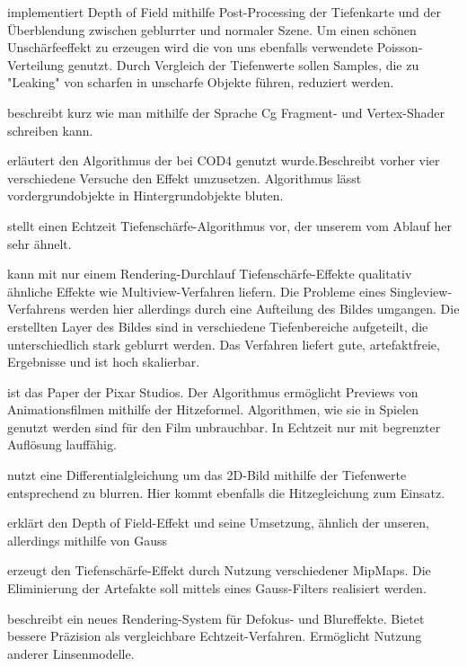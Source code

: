 \cite{Scheuermann:2004qf} implementiert Depth of Field mithilfe Post-Processing der Tiefenkarte und der Überblendung zwischen geblurrter und normaler Szene. Um einen schönen Unschärfeeffekt zu erzeugen wird die von uns ebenfalls verwendete Poisson-Verteilung genutzt. Durch Vergleich der Tiefenwerte sollen Samples, die zu "Leaking" von scharfen in unscharfe Objekte führen, reduziert werden.
 
\cite{Kilgard:2003dq} beschreibt kurz wie man mithilfe der Sprache Cg Fragment- und Vertex-Shader schreiben kann.

\cite{Earll-Hammon:2007oq} erläutert den Algorithmus der bei COD4 genutzt wurde.Beschreibt vorher vier verschiedene Versuche den Effekt umzusetzen. Algorithmus lässt vordergrundobjekte in Hintergrundobjekte bluten.

\cite{Dudash:2004fk} stellt einen Echtzeit Tiefenschärfe-Algorithmus vor, der unserem vom Ablauf her sehr ähnelt.

\cite{Sungkil-Lee:2009zr} kann mit nur einem Rendering-Durchlauf Tiefenschärfe-Effekte qualitativ ähnliche Effekte wie Multiview-Verfahren liefern. Die Probleme eines Singleview-Verfahrens werden hier allerdings durch eine Aufteilung des Bildes umgangen. Die erstellten Layer des Bildes sind in verschiedene Tiefenbereiche aufgeteilt, die unterschiedlich stark geblurrt werden. Das Verfahren liefert gute, artefaktfreie, Ergebnisse und ist hoch skalierbar.

\cite{Michael-Kass:2006uq} ist das Paper der Pixar Studios. Der Algorithmus ermöglicht Previews von Animationsfilmen mithilfe der Hitzeformel. Algorithmen, wie sie in Spielen genutzt werden sind für den Film unbrauchbar. In Echtzeit nur mit begrenzter Auflösung lauffähig.

\cite{Marcelo-Bertalmio:2004fk} nutzt eine Differentialgleichung um das 2D-Bild mithilfe der Tiefenwerte entsprechend zu blurren. Hier kommt ebenfalls die Hitzegleichung zum Einsatz.

\cite{Guennadi-Riguer:2003kx} erklärt den Depth of Field-Effekt und seine Umsetzung, ähnlich der unseren, allerdings mithilfe von Gauss

\cite{Sungkil-Lee:2008bh} erzeugt den Tiefenschärfe-Effekt durch Nutzung verschiedener MipMaps. Die Eliminierung der Artefakte soll mittels eines Gauss-Filters realisiert werden.

\cite{Sungkil-Lee:2010ve} beschreibt ein neues Rendering-System für Defokus- und Blureffekte. Bietet bessere Präzision als vergleichbare Echtzeit-Verfahren. Ermöglicht Nutzung anderer Linsenmodelle.